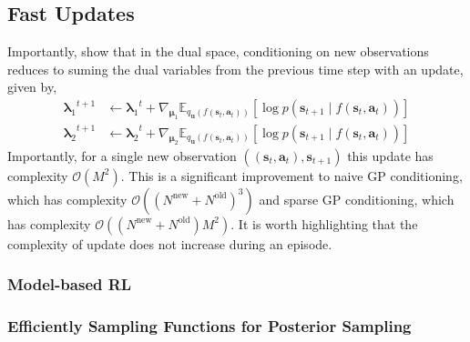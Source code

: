 \documentclass{article}
\newcommand{\state}{\ensuremath{\mathbf{s}}}
\newcommand{\action}{\ensuremath{\mathbf{a}}}
\newcommand{\inducingVariable}{\ensuremath{\mathbf{u}}}
\newcommand{\dualParam}[1]{\ensuremath{\bm{\lambda}_{#1}}}
\newcommand{\meanParam}[1]{\ensuremath{\bm{\mu}_{#1}}}
\newcommand{\numDataNew}{\ensuremath{N^{\text{new}}}}
\newcommand{\numDataOld}{\ensuremath{N^{\text{old}}}}
\newcommand{\numInducing}{\ensuremath{M}}
\newcommand{\latentFn}{\ensuremath{f}}
\begin{document}
\subsection{Fast Updates}
Importantly, \cite{changFantasizingDualGPs2022} show that in the dual space,
conditioning on new observations reduces to suming the dual variables from the previous time
step with an update, given by,
\begin{align} \label{eq-dual-update-svgp}
\dualParam{1}^{t+1} &\leftarrow \dualParam{1}^{t} +  \nabla_{\meanParam{1}} \mathbb{E}_{q_{\inducingVariable}(\latentFn(\state_{t}, \action_{t}))} \left[ \log p(\state_{t+1} \mid \latentFn(\state_{t}, \action_{t}) ) \right] \\
\dualParam{2}^{t+1} &\leftarrow \dualParam{2}^{t} +  \nabla_{\meanParam{2}} \mathbb{E}_{q_{\inducingVariable}(\latentFn(\state_{t}, \action_{t}))}  \left[ \log p(\state_{t+1} \mid \latentFn(\state_{t}, \action_{t}) ) \right]
\end{align}
Importantly, for a single new observation $((\state_{t}, \action_{t}), \state_{t+1})$ this update has
complexity $\mathcal{O}(\numInducing^{2})$.
This is a significant improvement to naive GP conditioning, which has complexity $\mathcal{O}((\numDataNew + \numDataOld)^{3})$
and sparse GP conditioning, which has complexity $\mathcal{O}((\numDataNew + \numDataOld)\numInducing^{2})$.
It is worth highlighting that the complexity of \cite{changFantasizingDualGPs2022} update does not increase during an episode.

\subsubsection{Model-based RL}

\subsubsection{Efficiently Sampling Functions for Posterior Sampling}
\cite{wilsonEfficiently2020}
\cite{wilsonPathwise2021}
\end{document}
